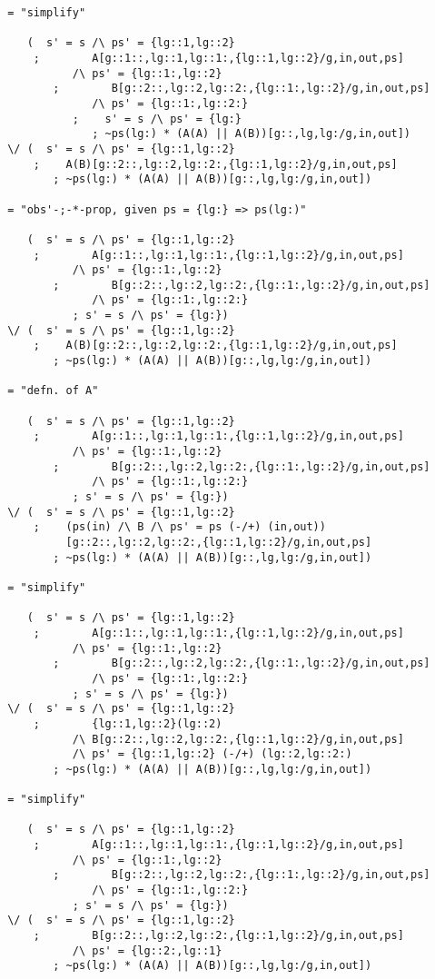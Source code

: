 \begin{verbatim}
 = "simplify"

    (  s' = s /\ ps' = {lg::1,lg::2}
     ;        A[g::1::,lg::1,lg::1:,{lg::1,lg::2}/g,in,out,ps]
           /\ ps' = {lg::1:,lg::2}
        ;        B[g::2::,lg::2,lg::2:,{lg::1:,lg::2}/g,in,out,ps]
              /\ ps' = {lg::1:,lg::2:}
           ;    s' = s /\ ps' = {lg:}
              ; ~ps(lg:) * (A(A) || A(B))[g::,lg,lg:/g,in,out])
 \/ (  s' = s /\ ps' = {lg::1,lg::2}
     ;    A(B)[g::2::,lg::2,lg::2:,{lg::1,lg::2}/g,in,out,ps]
        ; ~ps(lg:) * (A(A) || A(B))[g::,lg,lg:/g,in,out])

 = "obs'-;-*-prop, given ps = {lg:} => ps(lg:)"

    (  s' = s /\ ps' = {lg::1,lg::2}
     ;        A[g::1::,lg::1,lg::1:,{lg::1,lg::2}/g,in,out,ps]
           /\ ps' = {lg::1:,lg::2}
        ;        B[g::2::,lg::2,lg::2:,{lg::1:,lg::2}/g,in,out,ps]
              /\ ps' = {lg::1:,lg::2:}
           ; s' = s /\ ps' = {lg:})
 \/ (  s' = s /\ ps' = {lg::1,lg::2}
     ;    A(B)[g::2::,lg::2,lg::2:,{lg::1,lg::2}/g,in,out,ps]
        ; ~ps(lg:) * (A(A) || A(B))[g::,lg,lg:/g,in,out])

 = "defn. of A"

    (  s' = s /\ ps' = {lg::1,lg::2}
     ;        A[g::1::,lg::1,lg::1:,{lg::1,lg::2}/g,in,out,ps]
           /\ ps' = {lg::1:,lg::2}
        ;        B[g::2::,lg::2,lg::2:,{lg::1:,lg::2}/g,in,out,ps]
              /\ ps' = {lg::1:,lg::2:}
           ; s' = s /\ ps' = {lg:})
 \/ (  s' = s /\ ps' = {lg::1,lg::2}
     ;    (ps(in) /\ B /\ ps' = ps (-/+) (in,out))
          [g::2::,lg::2,lg::2:,{lg::1,lg::2}/g,in,out,ps]
        ; ~ps(lg:) * (A(A) || A(B))[g::,lg,lg:/g,in,out])

 = "simplify"

    (  s' = s /\ ps' = {lg::1,lg::2}
     ;        A[g::1::,lg::1,lg::1:,{lg::1,lg::2}/g,in,out,ps]
           /\ ps' = {lg::1:,lg::2}
        ;        B[g::2::,lg::2,lg::2:,{lg::1:,lg::2}/g,in,out,ps]
              /\ ps' = {lg::1:,lg::2:}
           ; s' = s /\ ps' = {lg:})
 \/ (  s' = s /\ ps' = {lg::1,lg::2}
     ;        {lg::1,lg::2}(lg::2)
           /\ B[g::2::,lg::2,lg::2:,{lg::1,lg::2}/g,in,out,ps]
           /\ ps' = {lg::1,lg::2} (-/+) (lg::2,lg::2:)
        ; ~ps(lg:) * (A(A) || A(B))[g::,lg,lg:/g,in,out])

 = "simplify"

    (  s' = s /\ ps' = {lg::1,lg::2}
     ;        A[g::1::,lg::1,lg::1:,{lg::1,lg::2}/g,in,out,ps]
           /\ ps' = {lg::1:,lg::2}
        ;        B[g::2::,lg::2,lg::2:,{lg::1:,lg::2}/g,in,out,ps]
              /\ ps' = {lg::1:,lg::2:}
           ; s' = s /\ ps' = {lg:})
 \/ (  s' = s /\ ps' = {lg::1,lg::2}
     ;        B[g::2::,lg::2,lg::2:,{lg::1,lg::2}/g,in,out,ps]
           /\ ps' = {lg::2:,lg::1}
        ; ~ps(lg:) * (A(A) || A(B))[g::,lg,lg:/g,in,out])


\end{verbatim}
